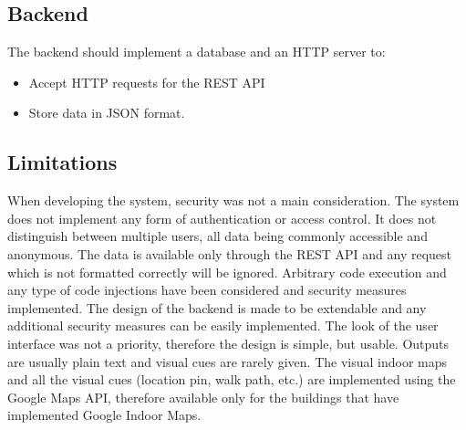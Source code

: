 \subsection{Backend}
The backend should implement a database and an HTTP server to:
	\begin{itemize}
		\item Accept HTTP requests for the REST API
		\item Store data in JSON format.
	\end{itemize}

\subsection{Limitations}
When developing the system, security was not a main consideration. The system does not implement any form of authentication or access control. It does not distinguish between multiple users, all data being commonly accessible and anonymous. 
The data is available only through the REST API and any request which is not formatted correctly will be ignored. Arbitrary code execution and any type of code injections have been considered and security measures implemented.
The design of the backend is made to be extendable and any additional security measures can be easily implemented.
The look of the user interface was not a priority, therefore the design is simple, but usable. Outputs are usually plain text and visual cues are rarely given. 
The visual indoor maps and all the visual cues (location pin, walk path, etc.) are implemented using the Google Maps API, therefore available only for the buildings that have implemented Google Indoor Maps.